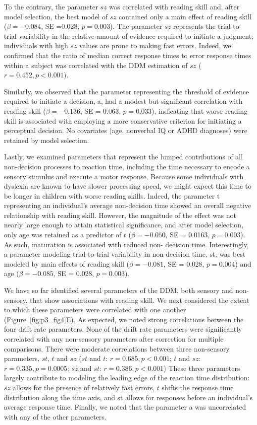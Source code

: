 \documentclass[../uwthesis.tex]{subfiles}
\begin{document}
To the contrary, the parameter $sz$ was correlated with reading skill and, after model
selection, the best model of $sz$ contained only a main effect of reading skill ($\beta = -0.084$, SE =0.028, $p = 0.003$). The parameter $sz$ represents the trial-to-trial variability in the relative
amount of evidence required to initiate a judgment; individuals with high $sz$ values are prone to
making fast errors. Indeed, we confirmed that the ratio of median correct response times to error
response times within a subject was correlated with the DDM estimation of $sz$ ($r = 0.452, p<0.001$).

Similarly, we observed that the parameter representing the threshold of evidence required
to initiate a decision, a, had a modest but significant correlation with reading skill ($\beta = -0.136$, SE
= 0.063, $p = 0.033$), indicating that worse reading skill is associated with employing a more
conservative criterion for initiating a perceptual decision. No covariates (age, nonverbal IQ or
ADHD diagnoses) were retained by model selection.

Lastly, we examined parameters that represent the lumped contributions of all non-decision
processes to reaction time, including the time necessary to encode a sensory stimulus and execute
a motor response. Because some individuals with dyslexia are known to have slower processing
speed, we might expect this time to be longer in children with worse reading skills. Indeed, the
parameter t representing an individual’s average non-decision time showed an overall negative
relationship with reading skill. However, the magnitude of the effect was not nearly large enough
to attain statistical significance, and after model selection, only age was retained as a predictor of
$t$ ($\beta = -0.050$, SE = 0.0163, $p = 0.003$). As such, maturation is associated with reduced non-
decision time. Interestingly, a parameter modeling trial-to-trial variability in non-decision time, st,
was best modeled by main effects of reading skill ($\beta = -0.081$, SE = 0.028, $p = 0.004$) and
age ($\beta = -0.085$, SE = 0.028, $p = 0.003$).

We have so far identified several parameters of the DDM, both sensory and non-sensory,
that show associations with reading skill. We next considered the extent to which these parameters
were correlated with one another (Figure~\ref{fig:p3_fig4}E). As expected, we noted strong correlations between
the four drift rate parameters. None of the drift rate parameters were significantly correlated with
any non-sensory parameters after correction for multiple comparisons. There were moderate
correlations between three non-sensory parameters, $st$, $t$ and $sz$ ($st$ and $t$: $r = 0.685, p <0.001$; $t$ and $sz$: $r = 0.335, p = 0.0005$; $sz$ and $st$: $r = 0.386, p < 0.001$) These three parameters
largely contribute to modeling the leading edge of the reaction time distribution: $sz$ allows for the
presence of relatively fast errors, $t$ shifts the response time distribution along the time axis, and st
allows for responses before an individual’s average response time. Finally, we noted that the
parameter a was uncorrelated with any of the other parameters.
\end{document}
